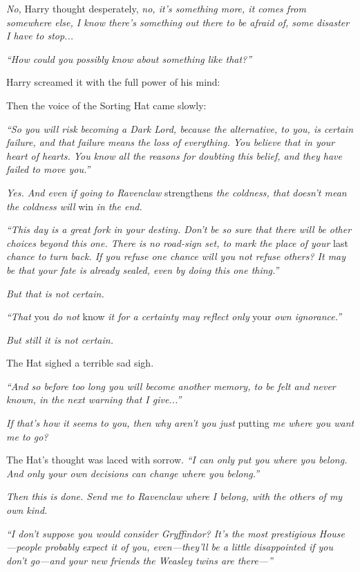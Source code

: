 \emph{No,} Harry thought desperately, \emph{no, it’s something more, it comes from somewhere else, I know there’s something out there to be afraid of, some disaster I have to stop...}

\emph{“How could you possibly know about something like that?”}

Harry screamed it with the full power of his mind: 

Then the voice of the Sorting Hat came slowly:

\emph{“So you will risk becoming a Dark Lord, because the alternative, to you, is certain failure, and that failure means the loss of everything. You believe that in your heart of hearts. You know all the reasons for doubting this belief, and they have failed to move you.”}

\emph{Yes. And even if going to Ravenclaw} strengthens \emph{the coldness, that doesn’t mean the coldness will} win \emph{in the end.}

\emph{“This day is a great fork in your destiny. Don’t be so sure that there will be other choices beyond this one. There is no road-sign set, to mark the place of your} last \emph{chance to turn back. If you refuse one chance will you not refuse others? It may be that your fate is already sealed, even by doing this one thing.”}

\emph{But that is not certain.}

\emph{“That} you \emph{do not} know \emph{it for a certainty may reflect only} your \emph{own ignorance.”}

\emph{But still it is not certain.}

The Hat sighed a terrible sad sigh.

\emph{“And so before too long you will become another memory, to be felt and never known, in the next warning that I give...”}

\emph{If that’s how it seems to you, then why aren’t you just} putting \emph{me where you want me to go?}

The Hat’s thought was laced with sorrow. \emph{“I can only put you where you belong. And only your own decisions can change where you belong.”}

\emph{Then this is done. Send me to Ravenclaw where I belong, with the others of my own kind.}

\emph{“I don’t suppose you would consider Gryffindor? It’s the most prestigious House—people probably expect it of you, even—they’ll be a little disappointed if you don’t go—and your new friends the Weasley twins are there—”}

